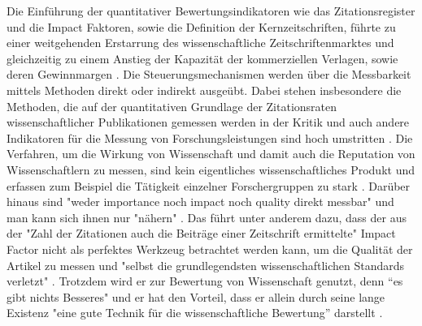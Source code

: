 Die Einführung der quantitativer Bewertungsindikatoren wie das Zitationsregister und die Impact Faktoren, sowie die Definition der Kernzeitschriften, führte zu einer weitgehenden Erstarrung des wissenschaftliche Zeitschriftenmarktes und gleichzeitig zu einem Anstieg der Kapazität der kommerziellen Verlagen, sowie deren Gewinnmargen \cite{CREATe_2014}. Die Steuerungsmechanismen werden über die Messbarkeit mittels Methoden direkt oder indirekt ausgeübt. Dabei stehen insbesondere die Methoden, die auf der quantitativen Grundlage der Zitationsraten wissenschaftlicher Publikationen gemessen werden in der Kritik \cite{Brembs_2013} \cite{Dong_2005} und auch andere Indikatoren für die Messung von Forschungsleistungen sind hoch umstritten \cite{Hornbostel_1997} \cite{Hicks_1996} \cite{Havemann_2002} \cite{Warnke_2012}. Die Verfahren, um die Wirkung von Wissenschaft und damit auch die Reputation von Wissenschaftlern zu messen, sind kein eigentliches wissenschaftliches Produkt \cite{suchen} und erfassen zum Beispiel die Tätigkeit einzelner Forschergruppen zu stark \cite{schmoch_2009}. Darüber hinaus sind "weder importance noch impact noch quality direkt messbar" und man kann sich ihnen nur "nähern" \cite{Hornbostel_1997}. Das führt unter anderem dazu, dass der aus der "Zahl der Zitationen auch die Beiträge einer Zeitschrift ermittelte" \cite{weishaupt_2009_goldenOA} Impact Factor nicht als perfektes Werkzeug betrachtet werden kann, um die Qualität der Artikel zu messen \cite{garfield_1999} und "selbst die grundlegendsten wissenschaftlichen Standards verletzt" \cite{Brembs_20013}. Trotzdem wird er zur Bewertung von Wissenschaft genutzt, denn “es gibt nichts Besseres" und er hat den Vorteil, dass er allein durch seine lange Existenz "eine gute Technik für die wissenschaftliche Bewertung” darstellt \cite{garfield_1999} \cite{weishaupt_2009_goldenOA}.

